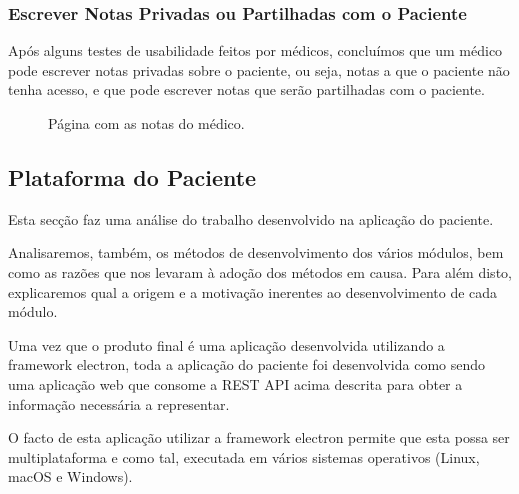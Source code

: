 \documentclass{TTUPhD}
\begin{document}
\newpage

\subsubsection{Escrever Notas Privadas ou Partilhadas com o Paciente}

Após alguns testes de usabilidade feitos por médicos, concluímos que um médico pode escrever notas privadas sobre o paciente, ou seja,
notas a que o paciente não tenha acesso, e que pode escrever notas que serão partilhadas com o paciente.

\begin{figure}[h!]
    \center
    \caption{Página com as notas do médico.}
    \label{fig:doctor6}
\end{figure}

\subsection{Plataforma do Paciente}

Esta secção faz uma análise do trabalho desenvolvido na aplicação do paciente.

Analisaremos, também, os métodos de desenvolvimento dos vários módulos, bem como as razões que nos levaram à adoção dos métodos em causa.
Para além disto, explicaremos qual a origem e a motivação inerentes ao desenvolvimento de cada módulo.

Uma vez que o produto final é uma aplicação desenvolvida utilizando a framework electron, toda a aplicação do paciente foi desenvolvida como sendo uma aplicação web
que consome a REST API acima descrita para obter a informação necessária a representar.

O facto de esta aplicação utilizar a framework electron permite que esta possa ser multiplataforma e como tal, executada em vários sistemas operativos (Linux, macOS e Windows).
\end{document}
